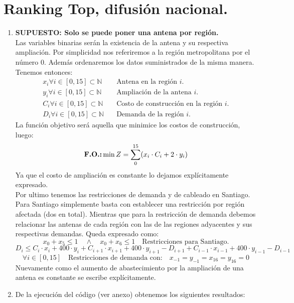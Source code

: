 \section{Ranking Top, difusión nacional.}
\begin{enumerate}
	\item
		\textbf{SUPUESTO: Solo se puede poner una antena por región.} \\
		Las variables binarias serán la existencia de la antena y su respectiva 
		ampliación. Por simplicidad nos referiremos a la región metropolitana
		por el número 0. Además ordenaremos los datos suministrados de la misma
		manera. Tenemos entonces:
		\begin{align*}
			x_i \forall i \in [0,15] \subset \mathbb{N} \quad 
				&\text{Antena en la región $i$.} \\
			y_i \forall i \in [0,15] \subset \mathbb{N} \quad
				&\text{Ampliación de la antena $i$.}\\
			C_i \forall i \in [0,15] \subset \mathbb{N} \quad
				&\text{Costo de construcción en la región $i$.}\\
			D_i \forall i \in [0,15] \subset \mathbb{N} \quad
				&\text{Demanda de la región $i$.}
		\end{align*}
		La función objetivo será aquella que minimice los costos de 
		construcción, luego:
		$$ \text{\textbf{F.O.:}}\min Z=\sum_0^{15}(x_i\cdot C_i +2\cdot y_i) $$
		Ya que el costo de ampliación es constante lo dejamos explícitamente
		expresado.\\
		Por ultimo tenemos las restricciones de demanda y de cableado en
		Santiago. Para Santiago simplemente basta con establecer una restricción
		por región afectada (dos en total). Mientras que para la restricción de
		demanda debemos relacionar las antenas de cada región con las de las
		regiones adyacentes y sus respectivas demandas. Queda expresado como:
		$$  x_0 + x_5 \leq 1 \quad \land \quad x_0 + x_6 \leq 1 
			\quad \text{Restricciones para Santiago.} $$
		$$	D_i \leq C_i \cdot x_i + 400 \cdot y_i +
			C_{i+1} \cdot x_{i+1} + 400 \cdot y_{i+1} - D_{i+1} +
			C_{i-1} \cdot x_{i-1} + 400 \cdot y_{i-1} - D_{i-1} $$
		 $$	\forall i \in [0,15] \quad \text{Restricciones de demanda con:}
		 \quad x_{-1} = y_{-1} = x_{16} = y_{16} = 0 $$ 
		 Nuevamente como el aumento de abastecimiento por la ampliación de una 
		 antena es constante se escribe explícitamente.
	\item
		De la ejecución del código (ver anexo) obtenemos los siguientes 
		resultados:
\end{enumerate}
